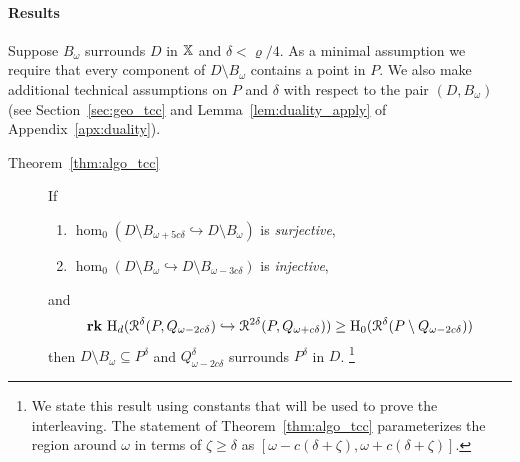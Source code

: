 
\paragraph*{Results}

Suppose $B_\omega$ surrounds $D$ in $\mathbb{X}$ and $\delta < \varrho / 4$.
As a minimal assumption we require that every component of $D\setminus B_\omega$ contains a point in $P$.
We also make additional technical assumptions on $P$ and $\delta$ with respect to the pair $(D, B_\omega)$ (see Section~\ref{sec:geo_tcc} and Lemma~\ref{lem:duality_apply} of Appendix~\ref{apx:duality}).

\begin{description}
  \item[Theorem~\ref{thm:algo_tcc}] If
    \begin{enumerate}[label=\Roman*.]
      \item $\hom_0(D\setminus B_{\omega+5c\delta}\hookrightarrow D\setminus B_\omega)$ is \emph{surjective},
      \item $\hom_0(D\setminus B_\omega\hookrightarrow D\setminus B_{\omega-3c\delta})$ is \emph{injective},
    \end{enumerate}
    and
    \[ \mathbf{rk}~\mathrm{H}_d(\mathcal{R}^\delta(P, Q_{\omega - 2c\delta})\hookrightarrow \mathcal{R}^{2\delta}(P, Q_{\omega+c\delta}))\geq \mathrm{H}_0(\mathcal{R}^\delta(P\setminus Q_{\omega-2c\delta})) \]
    then $D\setminus B_\omega\subseteq P^\delta$ and $Q_{\omega-2c\delta}^\delta$ surrounds $P^\delta$ in $D$.
    \footnote{We state this result using constants that will be used to prove the interleaving.
      The statement of Theorem~\ref{thm:algo_tcc} parameterizes the region around $\omega$ in terms of $\zeta\geq\delta$ as $[\omega-c(\delta+\zeta),\omega+c(\delta+\zeta)]$.}
\end{description}

